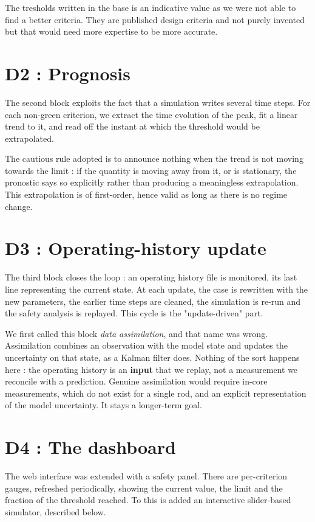 \documentclass[12pt,a4paper]{report}
\begin{document}
The tresholds written in the base is an indicative value as we were not able to find
a better criteria. They are published design criteria and not purely invented but
that would need more expertise to be more accurate.


\section{D2 : Prognosis}

The second block exploits the fact that a simulation writes several time steps.
For each non-green criterion, we extract the time evolution of the peak, fit a
linear trend to it, and read off the instant at which the threshold would be
extrapolated.

The cautious rule adopted is to announce nothing when the trend is not moving
towards the limit : if the quantity is moving away from it, or is stationary, the
pronostic says so explicitly rather than producing a meaningless extrapolation.
This extrapolation is of first-order, hence valid as long as there is no regime change.

\section{D3 : Operating-history update}

The third block closes the loop : an operating history file is monitored, its
last line representing the current state. At each update, the case is rewritten
with the new parameters, the earlier time steps are cleaned, the simulation is
re-run and the safety analysis is replayed. This cycle is the "update-driven" part.

We first called this block \emph{data assimilation}, and that name was wrong.
Assimilation combines an observation with the model state and updates the
uncertainty on that state, as a Kalman filter does. Nothing of the sort happens
here : the operating history is an \textbf{input} that we replay, not a
measurement we reconcile with a prediction. Genuine assimilation would require
in-core measurements, which do not exist for a single rod, and an explicit
representation of the model uncertainty. It stays a longer-term goal.

\section{D4 : The dashboard}

The web interface was extended with a safety panel. There are per-criterion gauges,
refreshed periodically, showing the current value, the limit and the fraction of
the threshold reached. To this is added an interactive slider-based simulator,
described below.
\end{document}
